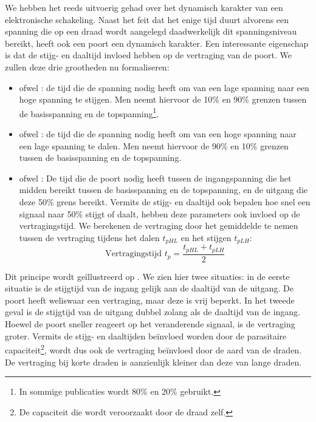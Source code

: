 We hebben het reeds uitvoerig gehad over het dynamisch karakter van een elektronische schakeling. Naast het feit dat het enige tijd duurt alvorens een spanning die op een draad wordt aangelegd daadwerkelijk dit spanningsniveau bereikt, heeft ook een poort een dynamisch karakter. Een interessante eigenschap is dat de stijg- en daaltijd invloed hebben op de vertraging van de poort. We zullen deze drie grootheden nu formaliseren:
\begin{itemize}
 \item {} ofwel : de tijd die de spanning nodig heeft om van een lage spanning naar een hoge spanning te stijgen. Men neemt hiervoor de 10\% en 90\% grenzen tussen de basisspanning en de topspanning\footnote{In sommige publicaties wordt 80\% en 20\% gebruikt.}.
 \item {} ofwel : de tijd die de spanning nodig heeft om van een hoge spanning naar een lage spanning te dalen. Men neemt hiervoor de 90\% en 10\% grenzen tussen de basisspanning en de topspanning.
 \item {} ofwel : De tijd die de poort nodig heeft tussen de ingangspanning die het midden bereikt tussen de basisspanning en de topspanning, en de uitgang die deze 50\% grens bereikt. Vermits de stijg- en daaltijd ook bepalen hoe snel een signaal naar 50\% stijgt of daalt, hebben deze parameters ook invloed op de vertragingstijd. We berekenen de vertraging door het gemiddelde te nemen tussen de vertraging tijdens het dalen $t_{pHL}$ en het stijgen $t_{pLH}$:
\begin{equation}
\mbox{Vertragingstijd $t_p$}=\displaystyle\frac{t_{pHL}+t_{pLH}}{2}
\end{equation}
\end{itemize}
Dit principe wordt ge\"illustreerd op . We zien hier twee situaties: in de eerste situatie is de stijgtijd van de ingang gelijk aan de daaltijd van de uitgang. De poort heeft weliswaar een vertraging, maar deze is vrij beperkt. In het tweede geval is de stijgtijd van de uitgang dubbel zolang als de daaltijd van de ingang. Hoewel de poort sneller reageert op het veranderende signaal, is de vertraging groter. Vermits de stijg- en daaltijden be\"invloed worden door de parasitaire capaciteit\footnote{De capaciteit die wordt veroorzaakt door de draad zelf.}, wordt dus ook de vertraging be\"invloed door de aard van de draden. De vertraging bij korte draden is aanzienlijk kleiner dan deze van lange draden.
